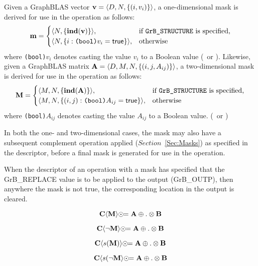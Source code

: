 Given a GraphBLAS vector ${\bf v} = \langle D,N, \{ (i,v_i) \} \rangle$, a
one-dimensional mask is derived for use in the operation as follows:
\[
{\bf m} = 
\begin{cases}
\langle N, \{ \mathbf{ind}({\bf v}) \} \rangle, & \mbox{if {\tt GrB\_STRUCTURE} is specified,} \\
\langle N, \{ i : \mbox{\tt (bool)}v_i = {\sf true} \} \rangle, & \mbox{otherwise}
\end{cases}
\]
where {\tt (bool)}$v_i$ denotes casting the value $v_i$ to a Boolean value (\true\ or \false).
Likewise, given a GraphBLAS matrix ${\bf A} = \langle D, M, N, \{ (i,j,A_{ij}) \} \rangle$,
a two-dimensional mask is derived for use in the operation as follows:
\[
{\bf M} = 
\begin{cases}
\langle M,N, \{ \mathbf{ind}({\bf A}) \} \rangle, & \mbox{if {\tt GrB\_STRUCTURE} is specified,} \\
\langle M,N, \{ (i,j) : \mbox{\tt (bool)}A_{ij} = {\sf true} \} \rangle, & \mbox{otherwise}
\end{cases}
\]
where {\tt (bool)}$A_{ij}$ denotes casting the value $A_{ij}$ to a Boolean value. 
(\true\ or \false)

In both the one- and two-dimensional cases, the mask may also have a subsequent 
complement operation applied ($Section$~\ref{Sec:Masks}) as specified in the 
descriptor, before a final mask is generated for use in the operation.

When the descriptor of an operation with a mask has specified that 
the {\sf GrB\_REPLACE} value is to be applied to the output ({\sf GrB\_OUTP}),
then anywhere the mask is not {\sf true}, the corresponding location in
the output is cleared.

$$
{\bf C} \langle {\bf M} \rangle \odot\!\!= {\bf A} \oplus.\otimes {\bf B}
$$

$$
{\bf C} \langle \neg{{\bf M}} \rangle \odot\!\!= {\bf A} \oplus.\otimes {\bf B}
$$

$$
{\bf C} \langle s({\bf M}) \rangle \odot\!\!= {\bf A} \oplus.\otimes {\bf B}
$$

$$
{\bf C} \langle s(\neg{{\bf M}} \rangle \odot\!\!= {\bf A} \oplus.\otimes {\bf B}
$$


